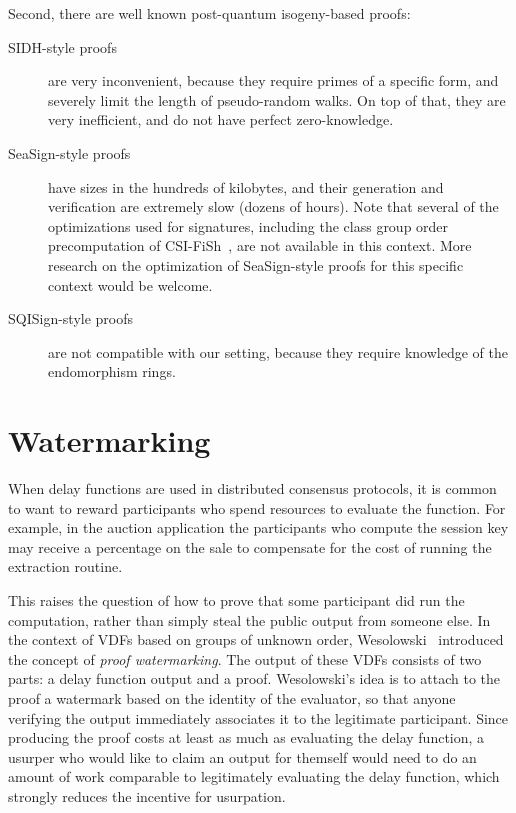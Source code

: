 \documentclass{llncs}
\begin{document}
Second, there are well known post-quantum isogeny-based proofs:
\begin{description}
\item[SIDH-style proofs~\cite{defeo+jao+plut12}] %
  are very inconvenient, because they require primes of a specific
  form, and severely limit the length of pseudo-random walks. %
  On top of that, they are very inefficient, and do not have perfect
  zero-knowledge. %
\item[SeaSign-style proofs~\cite{10.1007/978-3-030-17659-4_26}] %
  have sizes in the hundreds of kilobytes, and their generation and
  verification are extremely slow (dozens of hours). %
  Note that several of the optimizations used for signatures,
  including the class group order precomputation of
  CSI-FiSh~\cite{10.1007/978-3-030-34578-5_9}, are not available in
  this context. %
  More research on the optimization of SeaSign-style proofs for this
  specific context would be welcome.
\item[SQISign-style proofs~\cite{AC:DKLPW20}] are not compatible with
  our setting, because they require knowledge of the endomorphism
  rings.
\end{description}


\section{Watermarking}
\label{sec:watermarking}

When delay functions are used in distributed consensus protocols, it
is common to want to reward participants who spend resources to
evaluate the function. %
For example, in the auction application the participants who compute
the session key may receive a percentage on the sale to compensate for
the cost of running the extraction routine.

This raises the question of how to prove that some participant did run
the computation, rather than simply steal the public output from
someone else. %
In the context of VDFs based on groups of unknown order,
Wesolowski~\cite{Wesolowski} introduced the concept of \emph{proof
  watermarking}. %
The output of these VDFs consists of two parts: a delay function
output and a proof. %
Wesolowski's idea is to attach to the proof a watermark based on the
identity of the evaluator, so that anyone verifying the output
immediately associates it to the legitimate participant. %
Since producing the proof costs at least as much as evaluating the
delay function, a usurper who would like to claim an output for
themself would need to do an amount of work comparable to legitimately
evaluating the delay function, which strongly reduces the incentive
for usurpation.
\end{document}

